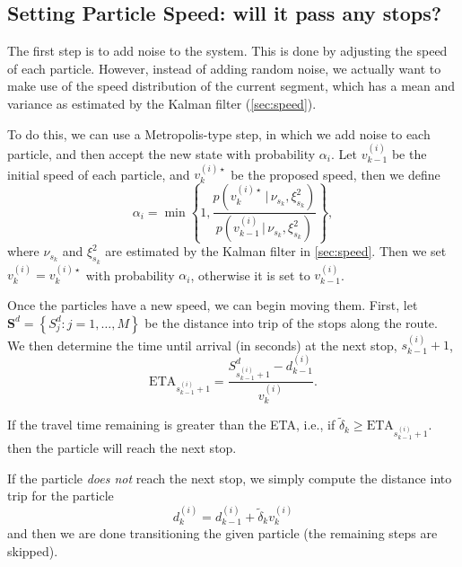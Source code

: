 \documentclass[14paper,twoside]{article}
\begin{document}
\subsection{Setting Particle Speed: will it pass any stops?}
\label{sec:speed_pass}

The first step is to add noise to the system.
This is done by adjusting the speed of each particle.
However, instead of adding random noise, 
we actually want to make use of the speed distribution of the current segment,
which has a mean and variance as estimated by the Kalman filter (\cref{sec:speed}).

To do this, we can use a Metropolis-type step, in which we add noise to each particle,
and then accept the new state with probability $\alpha_i$.
Let $v_{k-1}^{(i)}$ be the initial speed of each particle,
and $v_k^{(i)\star}$ be the proposed speed, then we define
\begin{equation}
  \label{eq:speed_alpha_proposal}
  \alpha_i = \min\left\{
    1, \frac{p\left(v_k^{(i)\star}\,|\, \nu_{s_k}, \xi_{s_k}^2 \right)}{p\left(v_{k-1}^{(i)}\,|\, \nu_{s_k}, \xi_{s_k}^2 \right)}
  \right\},
\end{equation}
where $\nu_{s_k}$ and $\xi_{s_k}^2$ are estimated by the Kalman filter in \cref{sec:speed}.
Then we set $v_k^{(i)} = v_k^{(i)\star}$ with probability $\alpha_i$, otherwise it is set to $v_{k-1}^{(i)}$.


Once the particles have a new speed, we can begin moving them.
First, let $\mathbf{S}^d = \left\{ S_j^d : j = 1, \ldots, M \right\}$ be the distance into trip
of the stops along the route.
We then determine the time until arrival (in seconds) at the next stop, $s_{k-1}^{(i)} + 1$,
\begin{equation}
  \label{eq:time_till_arrival}
  \mathrm{ETA}_{s_{k-1}^{(i)} + 1} = \frac{S^d_{s_{k-1}^{(i)} + 1} - d_{k-1}^{(i)}}{v_k^{(i)}}.
\end{equation}

If the travel time remaining is greater than the ETA, i.e., if $\tilde\delta_k \geq \mathrm{ETA}_{s_{k-1}^{(i)} + 1}$.
then the particle will reach the next stop.

If the particle \emph{does not} reach the next stop, we simply compute the distance into trip for the particle
\begin{equation}
  \label{eq:distance_into_trip_traveled}
  d_k^{(i)} = d_{k-1}^{(i)} + \tilde\delta_k v_k^{(i)}
\end{equation}
and then we are done transitioning the given particle (the remaining steps are skipped).
\end{document}
